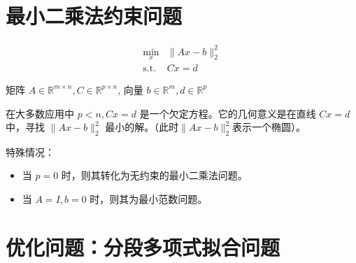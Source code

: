 \section{最小二乘法约束问题}

\begin{problem}[分段多项式拟合问题]
    \begin{equation}\begin{aligned}
        \min _{x} &\|A x-b\|_{2}^{2} \\
        \text{s.t.} & Cx =d 
    \end{aligned}\end{equation}

    矩阵 $ {A} \in \mathbb{R}^{m \times n}, {C} \in \mathbb{R}^{p \times n} $, 向量 $ {b} \in \mathbb{R}^{m}, d \in \mathbb{R}^{p} $
\end{problem}



在大多数应用中 $ p<n, C x=d $ 是一个欠定方程。它的几何意义是在直线 $ C x=d $ 中，寻找 $ \|A x-b\|_{2}^{2} $ 最小的解。（此时$\|A x-b\|_{2}^{2}$表示一个椭圆）。

特殊情况：

\begin{itemize}
    \item 当 $ {p}=0 $ 时，则其转化为无约束的最小二乘法问题。
    \item 当 $ {A}=I, b=0 $ 时，则其为最小范数问题。
\end{itemize}




\section{优化问题：分段多项式拟合问题}

